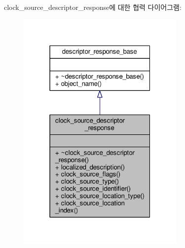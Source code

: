 clock\+\_\+source\+\_\+descriptor\+\_\+response에 대한 협력 다이어그램\+:
\nopagebreak
\begin{figure}[H]
\begin{center}
\leavevmode
\includegraphics[width=232pt]{classavdecc__lib_1_1clock__source__descriptor__response__coll__graph}
\end{center}
\end{figure}
